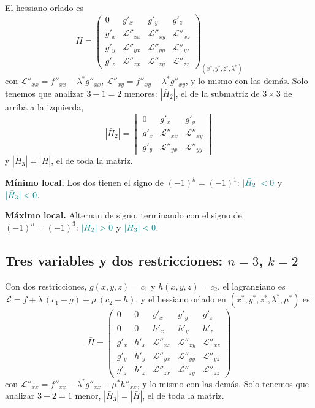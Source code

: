 \documentclass{article}
\begin{document}
El hessiano orlado es
\[
\bar H
=
\begin{pmatrix}
0 & g'_x & g'_y & g'_z \\[4pt]
g'_x & \mathcal L''_{xx} & \mathcal L''_{xy} & \mathcal L''_{xz} \\[4pt]
g'_y & \mathcal L''_{yx} & \mathcal L''_{yy} & \mathcal L''_{yz} \\[4pt]
g'_z & \mathcal L''_{zx} & \mathcal L''_{zy} & \mathcal L''_{zz}
\end{pmatrix}_{(x^*,y^*,z^*,\lambda^*)}
\]
con \(\mathcal L''_{xx}=f''_{xx}-\lambda^*g''_{xx}\), \(\mathcal L''_{xy}=f''_{xy}-\lambda^*g''_{xy}\), y lo mismo con las demás. Solo tenemos que analizar \(3-1=2\) menores: \(|\bar H_2|\), el de la submatriz de \(3\times3\) de arriba a la izquierda,
\[
|\bar H_2|
=
\begin{vmatrix}
0 & g'_x & g'_y \\
g'_x & \mathcal L''_{xx} & \mathcal L''_{xy} \\
g'_y & \mathcal L''_{yx} & \mathcal L''_{yy}
\end{vmatrix}
\]
y \(|\bar H_3|=|\bar H|\), el de toda la matriz.

\noindent\textbf{Mínimo local.} Los dos tienen el signo de \((-1)^k=(-1)^1\): \({\color{teal}|\bar H_2|<0}\) y \({\color{teal}|\bar H_3|<0}\).

\noindent\textbf{Máximo local.} Alternan de signo, terminando con el signo de \((-1)^n=(-1)^3\): \({\color{teal}|\bar H_2|>0}\) y \({\color{teal}|\bar H_3|<0}\).

\subsection*{Tres variables y dos restricciones: \(n=3\), \(k=2\)}

Con dos restricciones, \(g(x,y,z)=c_1\) y \(h(x,y,z)=c_2\), el lagrangiano es \(\mathcal L=f+\lambda\,(c_1-g)+\mu\,(c_2-h)\), y el hessiano orlado en \((x^*,y^*,z^*,\lambda^*,\mu^*)\) es
\[
\bar H
=
\begin{pmatrix}
0 & 0 & g'_x & g'_y & g'_z \\[4pt]
0 & 0 & h'_x & h'_y & h'_z \\[4pt]
g'_x & h'_x & \mathcal L''_{xx} & \mathcal L''_{xy} & \mathcal L''_{xz} \\[4pt]
g'_y & h'_y & \mathcal L''_{yx} & \mathcal L''_{yy} & \mathcal L''_{yz} \\[4pt]
g'_z & h'_z & \mathcal L''_{zx} & \mathcal L''_{zy} & \mathcal L''_{zz}
\end{pmatrix}
\]
con \(\mathcal L''_{xx}=f''_{xx}-\lambda^*g''_{xx}-\mu^*h''_{xx}\), y lo mismo con las demás. Solo tenemos que analizar \(3-2=1\) menor, \(|\bar H_3|=|\bar H|\), el de toda la matriz.
\end{document}
